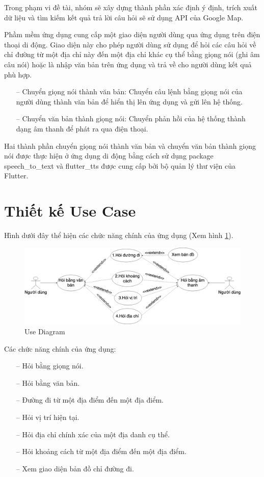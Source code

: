 Trong phạm vi đề tài, nhóm sẽ xây dựng thành phần xác định ý định, trích xuất dữ liệu và tìm kiếm kết quả trả lời câu hỏi sẽ sử dụng API của Google Map\cite{google-map}.

Phầm mềm ứng dụng cung cấp một giao diện người dùng qua ứng dụng trên điện thoại di động. Giao diện này cho phép người dùng sử dụng để hỏi các câu hỏi về chỉ đường từ một địa chỉ này đến một địa chỉ khác cụ thể bằng giọng nói (ghi âm câu nói) hoặc là nhập văn bản trên ứng dụng và trả về cho người dùng kết quả phù hợp.
\begin{itemize}
    \item[--] Chuyển giọng nói thành văn bản: Chuyển câu lệnh bằng giọng nói của người dùng thành văn bản để hiển thị lên ứng dụng và gửi lên hệ thống.
    \item[--] Chuyển văn bản thành giọng nói: Chuyển phản hồi của hệ thống thành dạng âm thanh để phát ra qua điện thoại.
\end{itemize}

Hai thành phần chuyển giọng nói thành văn bản và chuyển văn bản thành giọng nói được thực hiện ở ứng dụng di động bằng cách sử dụng package speech\_to\_text\cite{stt} và flutter\_tts\cite{tts} được cung cấp bởi bộ quản lý thư viện của Flutter.

\section{Thiết kế Use Case}
Hình dưới đây thể hiện các chức năng chính của ứng dụng (Xem hình \ref{fig:UC}). 
\begin{figure}[H]
    \centering
    \includegraphics[width=15cm]{images/ChatbotSRS-UseCase.png}
    \caption{Use Diagram}
    \label{fig:UC}
\end{figure}

Các chức năng chính của ứng dụng:
\begin{itemize}
    \item[--] Hỏi bằng giọng nói. 
    \item[--] Hỏi bằng văn bản.
    \item[--] Đường đi từ một địa điểm đến một địa điểm.
    \item[--] Hỏi vị trí hiện tại.
    \item[--] Hỏi địa chỉ chính xác của một địa danh cụ thể.
    \item[--] Hỏi khoảng cách từ một địa điểm đến một địa điểm.
    \item[--] Xem giao diện bản đồ chỉ đường đi. 
\end{itemize}

